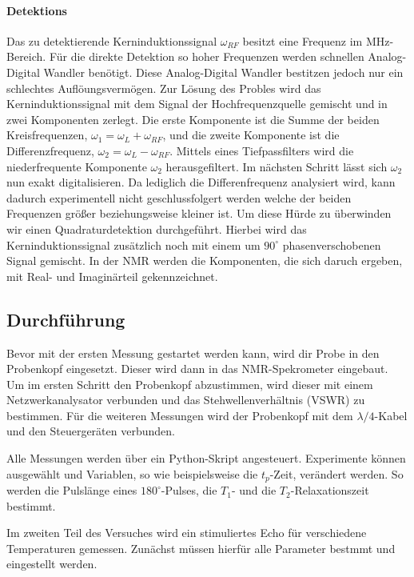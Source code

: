 \paragraph{Detektions}
Das zu detektierende Kerninduktionssignal $\omega_{RF}$ besitzt eine Frequenz im MHz-Bereich.
F\"{u}r die direkte Detektion so hoher Frequenzen werden schnellen Analog-Digital Wandler ben\"{o}tigt.
Diese Analog-Digital Wandler bestitzen jedoch nur ein schlechtes Aufl\"{o}ungsverm\"{o}gen.
Zur L\"{o}sung des Probles wird das Kerninduktionssignal mit dem Signal der Hochfrequenzquelle gemischt und in zwei Komponenten zerlegt.
Die erste Komponente ist die Summe der beiden Kreisfrequenzen, $\omega_1 = \omega_L + \omega_{RF}$, und die zweite Komponente ist die Differenzfrequenz, $\omega_2 = \omega_L - \omega_{RF}$.
Mittels eines Tiefpassfilters wird die niederfrequente Komponente $\omega_2$ herausgefiltert.
Im n\"{a}chsten Schritt l\"{a}sst sich $\omega_2$ nun exakt digitalisieren.
Da lediglich die Differenfrequenz analysiert wird, kann dadurch experimentell nicht geschlussfolgert werden welche der beiden Frequenzen gr\"{o}{\ss}er beziehungsweise kleiner ist.
Um diese H\"{u}rde zu \"{u}berwinden wir einen Quadraturdetektion durchgef\"{u}hrt.
Hierbei wird das Kerninduktionssignal zus\"{a}tzlich noch mit einem um $90^{\circ}$ phasenverschobenen Signal gemischt.
In der NMR werden die Komponenten, die sich daruch ergeben, mit Real- und Imagin\"{a}rteil gekennzeichnet.


\subsection{Durchf\"{u}hrung}
Bevor mit der ersten Messung gestartet werden kann, wird dir Probe in den Probenkopf eingesetzt.
Dieser wird dann in das NMR-Spekrometer eingebaut.
Um im ersten Schritt den Probenkopf abzustimmen, wird dieser mit einem Netzwerkanalysator verbunden und das Stehwellenverh\"{a}ltnis (VSWR) zu bestimmen.
F\"{u}r die weiteren Messungen wird der Probenkopf mit dem $\lambda / 4$-Kabel und den Steuerger\"{a}ten verbunden.

Alle Messungen werden \"{u}ber ein Python-Skript angesteuert.
Experimente k\"{o}nnen ausgew\"{a}hlt und Variablen, so wie beispielsweise die $t_p$-Zeit, ver\"{a}ndert werden.
So werden die Pulsl\"{a}nge eines $180^{\circ}$-Pulses, die $T_1$- und die $T_2$-Relaxationszeit bestimmt.

Im zweiten Teil des Versuches wird ein stimuliertes Echo f\"{u}r verschiedene Temperaturen gemessen.
Zun\"{a}chst m\"{u}ssen hierf\"{u}r alle Parameter bestmmt und eingestellt werden.
